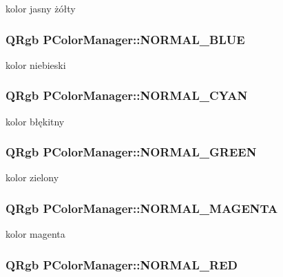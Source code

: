 kolor jasny żółty \hypertarget{classPColorManager_530893a4eed2d71ce67dff0d500bd0d6}{
\subsubsection[{NORMAL\_\-BLUE}]{\setlength{\rightskip}{0pt plus 5cm}QRgb {\bf PColorManager::NORMAL\_\-BLUE}}}
\label{classPColorManager_530893a4eed2d71ce67dff0d500bd0d6}


kolor niebieski \hypertarget{classPColorManager_9b51000ba56bf9a5f0581fd6c9a51ab6}{
\subsubsection[{NORMAL\_\-CYAN}]{\setlength{\rightskip}{0pt plus 5cm}QRgb {\bf PColorManager::NORMAL\_\-CYAN}}}
\label{classPColorManager_9b51000ba56bf9a5f0581fd6c9a51ab6}


kolor błękitny \hypertarget{classPColorManager_a2e75d69d65d6a7f87a470c0782a7624}{
\subsubsection[{NORMAL\_\-GREEN}]{\setlength{\rightskip}{0pt plus 5cm}QRgb {\bf PColorManager::NORMAL\_\-GREEN}}}
\label{classPColorManager_a2e75d69d65d6a7f87a470c0782a7624}


kolor zielony \hypertarget{classPColorManager_28bb798b6307bd6b6bdd59204f3dc131}{
\subsubsection[{NORMAL\_\-MAGENTA}]{\setlength{\rightskip}{0pt plus 5cm}QRgb {\bf PColorManager::NORMAL\_\-MAGENTA}}}
\label{classPColorManager_28bb798b6307bd6b6bdd59204f3dc131}


kolor magenta \hypertarget{classPColorManager_c6f06fc1bb188fe7d7f573ff3c46df8d}{
\subsubsection[{NORMAL\_\-RED}]{\setlength{\rightskip}{0pt plus 5cm}QRgb {\bf PColorManager::NORMAL\_\-RED}}}
\label{classPColorManager_c6f06fc1bb188fe7d7f573ff3c46df8d}


